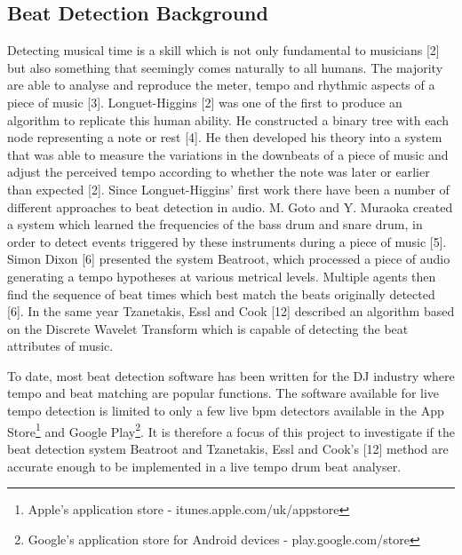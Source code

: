 \documentclass[a4paper, 11pt]{article}
\begin{document}
\subsection{Beat Detection Background}

Detecting musical time is a skill which is not only fundamental to musicians [2] but also something that seemingly comes naturally to all humans. The majority are able to analyse and reproduce the meter, tempo and rhythmic aspects of a piece of music [3]. Longuet-Higgins [2] was one of the first to produce an algorithm to replicate this human ability. He constructed a binary tree with each node representing a note or rest [4]. He then developed his theory into a system that was able to measure the variations in the downbeats of a piece of music and adjust the perceived tempo according to whether the note was later or earlier than expected [2]. Since Longuet-Higgins' first work there have been a number of different approaches to beat detection in audio. M. Goto and Y. Muraoka created a system which learned the frequencies of the bass drum and snare drum, in order to detect events triggered by these instruments during a piece of music [5]. Simon Dixon [6] presented the system Beatroot, which processed a piece of audio generating a tempo hypotheses at various metrical levels. Multiple agents then find the sequence of beat times which best match the beats originally detected [6]. In the same year Tzanetakis, Essl and Cook [12] described an algorithm based on the Discrete Wavelet Transform which is capable of detecting the beat attributes of music. 


To date, most beat detection software has been written for the DJ industry where tempo and beat matching are popular functions. The software available for live tempo detection is limited to only a few live bpm detectors available in the App Store\footnote{Apple's application store - itunes.apple.com/uk/appstore‎} and Google Play\footnote{Google's application store for Android devices - play.google.com/store}. It is therefore a focus of this project to investigate if the beat detection system Beatroot and Tzanetakis, Essl and Cook's [12] method are accurate enough to be implemented in a live tempo drum beat analyser.
\end{document}
